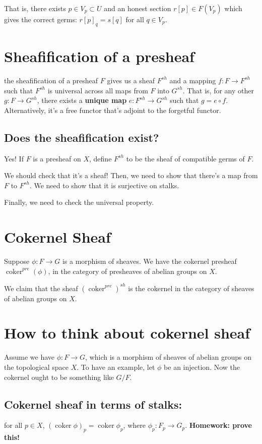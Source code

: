 \documentclass{book}
\newcommand{\coker}{\operatorname{coker}}
\theoremstyle{definition}
\begin{document}
That is, there exists $p \in V_p \subset U$ and an honest section $r[p] \in F(V_p)$
which gives the correct germs: $r[p]_q = s[q]$ for all $q \in V_p$.


\section{Sheafification of a presheaf}
the sheafification of a presheaf $F$ gives us a sheaf $F^{sh}$ and a mapping $f: F \rightarrow F^{sh}$
such that $F^{sh}$ is universal across all maps from $F$ into $G^{sh}$. That is,
for any other $g: F \rightarrow G^{sh}$, there exists a \textbf{unique map}
$e: F^{sh} \rightarrow G^{sh}$ such that $g = e \circ f$. Alternatively, it's
a free functor that's adjoint to the forgetful functor.

\subsection{Does the sheafification exist?}
Yes! If $F$ is a presheaf on $X$, define $F^{sh}$ to be the
sheaf of compatible germs of $F$.

We should check that it's a sheaf! Then, we need to show that there's a map from $F$ to $F^{sh}$.
We need to show that it is surjective on stalks.

Finally, we need to check the universal property.

\section{Cokernel Sheaf}
Suppose $\phi: F \rightarrow G$ is a morphism of sheaves. We have the cokernel presheaf
$\coker^{pre}(\phi)$, in the category of presheaves of abelian groups on $X$.

We claim that the sheaf $(\coker^{pre})^{sh}$ is the cokernel in the category of
sheaves of abelian groups on $X$.

\section{How to think about cokernel sheaf}

Assume we have $\phi: F \rightarrow G$, which is a morphism of sheaves of abelian
groups on the topological space $X$. To have an example, let $\phi$ be an
injection. Now the cokernel ought to be something like $G/F$.


\subsection{Cokernel sheaf in terms of stalks:} for all $p \in X$, $(\coker \phi)_p = \coker \phi_p$, where
$\phi_p: F_p \rightarrow G_p$. \textbf{Homework: prove this!}
\end{document}
